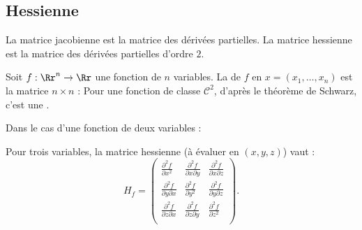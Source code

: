 \documentclass[11pt, class=report,crop=false]{standalone}
\begin{document}
\subsection{Hessienne}

La matrice jacobienne est la matrice des dérivées partielles.
La matrice hessienne est la matrice des dérivées partielles d'ordre $2$.

Soit $f : \Rr^n \to \Rr$ une fonction de $n$ variables.
La  de $f$ en $x=(x_1,\ldots,x_n)$ est la matrice $n \times n$ :
Pour une fonction de classe $\mathcal{C}^2$, d'après le théorème de Schwarz, c'est une .


Dans le cas d'une fonction de deux variables :

\bigskip

Pour trois variables, la matrice hessienne (à évaluer en $(x,y,z)$) vaut :
$$H_f=
\begin{pmatrix}
\frac{\partial^2f}{\partial x^2}&\frac{\partial^2f}{\partial x\partial y}&\frac{\partial^2f}{\partial x\partial z}\\  \frac{\partial^2f}{\partial y\partial x}&\frac{\partial^2f}{\partial y^2}&\frac{\partial^2f}{\partial y\partial z}\\  \frac{\partial^2f}{\partial z\partial x}&\frac{\partial^2f}{\partial z\partial y}&\frac{\partial^2f}{\partial z^2}\\
\end{pmatrix}.$$
\end{document}

